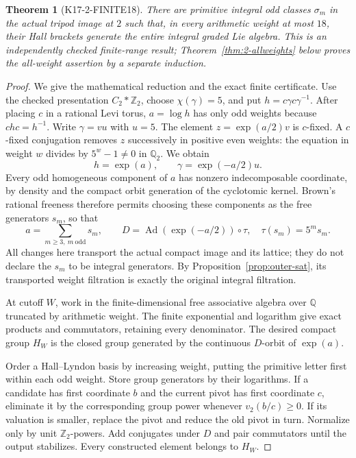 \documentclass[11pt,a4paper]{article}
\newtheorem{theorem}{Theorem}[section]
\theoremstyle{definition}
\begin{document}
\begin{theorem}[K17-2-FINITE18]\label{thm:2-finite18}
There are primitive integral odd classes $\sigma_m$ in the actual
tripod image at $2$ such that, in every arithmetic weight at most
$18$, their Hall brackets generate the entire integral graded
Lie algebra. This is an independently checked finite-range result;
Theorem~\ref{thm:2-allweights} below proves the all-weight assertion
by a separate induction.
\end{theorem}

\begin{proof}
We give the mathematical reduction and the exact finite
certificate. Use the checked presentation $C_2*\mathbb Z_2$,
choose $\chi(\gamma)=5$, and put $h=c\gamma c\gamma^{-1}$.
After placing $c$ in a rational Levi torus, $a=\log h$ has only
odd weights because $chc=h^{-1}$. Write $\gamma=v u$ with
$u=5$. The element $z=\exp(a/2)v$ is $c$-fixed. A $c$-fixed
conjugation removes $z$ successively in positive even weights:
the equation in weight $w$ divides by $5^w-1\ne0$ in
$\mathbb Q_2$. We obtain
\[
 h=\exp(a),\qquad \gamma=\exp(-a/2)u.
\]
Every odd homogeneous component of $a$ has nonzero
indecomposable coordinate, by density and the compact orbit
generation of the cyclotomic kernel. Brown's rational freeness
therefore permits choosing these components as the free
generators $s_m$, so that
\[
 a=\sum_{m\ge3,\ m\ {\mathrm{odd}}}s_m,\qquad
 D=\operatorname{Ad}(\exp(-a/2))\circ\tau,
 \quad\tau(s_m)=5^m s_m.
\]
All changes here transport the actual compact image and its
lattice; they do not declare the $s_m$ to be integral generators.
By Proposition~\ref{prop:outer-sat}, its transported weight
filtration is exactly the original integral filtration.

At cutoff $W$, work in the finite-dimensional free associative
algebra over $\mathbb Q$ truncated by arithmetic weight. The
finite exponential and logarithm give exact products and
commutators, retaining every denominator. The desired compact
group $H_W$ is the closed group generated by the continuous
$D$-orbit of $\exp(a)$.

Order a Hall--Lyndon basis by increasing weight, putting the
primitive letter first within each odd weight. Store group
generators by their logarithms. If a candidate has first
coordinate $b$ and the current pivot has first coordinate $c$,
eliminate it by the corresponding group power whenever
$v_2(b/c)\ge0$. If its valuation is smaller, replace the pivot
and reduce the old pivot in turn. Normalize only by unit
$\mathbb Z_2$-powers. Add conjugates under $D$ and pair
commutators until the output stabilizes. Every constructed
element belongs to $H_W$.


\end{proof}
\end{document}
